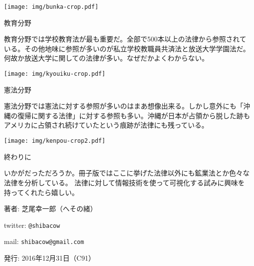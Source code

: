 \documentclass[,a6paper,openany,twoside]{jsarticle}
\begin{document}
\texttt{[image: img/bunka-crop.pdf]}






{\huge 教育分野}

教育分野では学校教育法が最も重要だ。全部で500本以上の法律から参照されている。その他地味に参照が多いのが私立学校教職員共済法と放送大学学園法だ。何故か放送大学に関しての法律が多い。なぜだかよくわからない。

\texttt{[image: img/kyouiku-crop.pdf]}



{\huge 憲法分野}

憲法分野では憲法に対する参照が多いのはまあ想像出来る。しかし意外にも「沖縄の復帰に関する法律」に対する参照も多い。沖縄が日本が占領から脱した跡もアメリカに占領され続けていたという痕跡が法律にも残っている。

\texttt{[image: img/kenpou-crop2.pdf]}

\newpage

{\huge 終わりに}

いかがだっただろうか。冊子版ではここに挙げた法律以外にも鉱業法とか色々な法律を分析している。
法律に対して情報技術を使って可視化する試みに興味を持ってくれたら嬉しい。

\begin{flushright}
\begin{minipage}{1.0\hsize}
\begin{description}[labelindent=1em ,labelwidth=0cm, labelsep*=1em, leftmargin =!, style = standard]%
  \item{著者:} 芝尾幸一郎（へその緒）
  \item{twitter:} \verb|@shibacow|
  \item{mail:} \verb|shibacow@gmail.com|
  \item{発行:} 2016年12月31日（C91）
\end{description}
\end{minipage}
\end{flushright}
\end{document}
